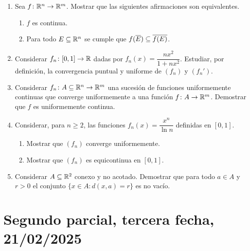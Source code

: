 \begin{enumerate}[label=(\arabic*)]
  \item Sea \(f\colon \mathbb{R}^n \to \mathbb{R}^m\). Mostrar que las siguientes afirmaciones son equivalentes.
        \begin{enumerate}[label=(\alph*)]
          \item \(f\) es continua.
          \item Para todo \(E \subseteq \mathbb{R}^n\) se cumple que \(f(\overline{E}) \subseteq \overline{f(E)}\).
        \end{enumerate}
  \item Considerar \(f_n\colon [0, 1] \to \mathbb{R}\) dadas por \(f_n(x) = \dfrac{n x^2}{1 + n x^2}\). Estudiar, por definición, la convergencia puntual y uniforme de \({(f_n)}\) y \({(f_n')}\).
  \item Considerar \(f_n\colon A \subseteq \mathbb{R}^n \to \mathbb{R}^m\) una sucesión de funciones uniformemente continuas que converge uniformemente a una función \(f\colon A \to \mathbb{R}^m\). Demostrar que \(f\) es uniformemente continua.
  \item Considerar, para \(n \geq 2\), las funciones \(f_n(x) = \dfrac{x^n}{\ln n}\) definidas en \([0, 1]\).
        \begin{enumerate}[label=(\alph*)]
          \item Mostrar que \({(f_n)}\) converge uniformemente.
          \item Mostrar que \({(f_n)}\) es equicontinua en \([0, 1]\).
        \end{enumerate}
  \item Considerar \(A \subseteq \mathbb{R}^2\) conexo y no acotado. Demostrar que para todo \(a \in A\) y \(r > 0\) el conjunto \(\{ x \in A : d(x, a) = r \}\) es no vacío.
\end{enumerate}

\clearpage

\section{Segundo parcial, tercera fecha, 21/02/2025}

